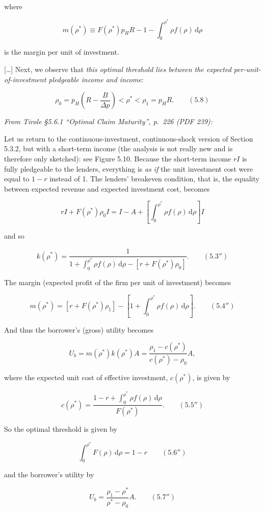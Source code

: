 \documentclass[11pt,a4paper]{article}
\begin{document}
where

\[m(\rho^*) \equiv F(\rho^*)p_HR - 1 - \int_0^{\rho^*}\rho f(\rho)\,\mathrm{d}\rho\]

is the margin per unit of investment.

{[}\ldots{]} Next, we observe that \emph{this optimal threshold lies between the expected
per-unit-of-investment pledgeable income and income}:

\[\rho_0 = p_H\left(R - \frac{B}{\Delta p}\right) < \rho^* < \rho_1 = p_HR. \qquad (5.8)\]

\emph{From Tirole §5.6.1 ``Optimal Claim Maturity'', p.~226 (PDF 239):}

Let us return to the continuous-investment, continuous-shock version of Section 5.3.2, but with a
short-term income (the analysis is not really new and is therefore only sketched): see Figure 5.10.
Because the short-term income \(rI\) is fully pledgeable to the lenders, everything is \emph{as if}
the unit investment cost were equal to \(1 - r\) instead of 1. The lenders' breakeven condition,
that is, the equality between expected revenue and expected investment cost, becomes

\[rI + F(\rho^*)\rho_0I = I - A + \left[\int_0^{\rho^*}\rho f(\rho)\,\mathrm{d}\rho\right]I\]

and so

\[k(\rho^*) = \frac{1}{1 + \int_0^{\rho^*}\rho f(\rho)\,\mathrm{d}\rho - [r + F(\rho^*)\rho_0]}. \qquad (5.3'')\]

The margin (expected profit of the firm per unit of investment) becomes

\[m(\rho^*) = [r + F(\rho^*)\rho_1] - \left[1 + \int_0^{\rho^*}\rho f(\rho)\,\mathrm{d}\rho\right]. \qquad (5.4'')\]

And thus the borrower's (gross) utility becomes

\[U_b = m(\rho^*)k(\rho^*)A = \frac{\rho_1 - c(\rho^*)}{c(\rho^*) - \rho_0}A,\]

where the expected unit cost of effective investment, \(c(\rho^*)\), is given by

\[c(\rho^*) = \frac{1 - r + \int_0^{\rho^*}\rho f(\rho)\,\mathrm{d}\rho}{F(\rho^*)}. \qquad (5.5'')\]

So the optimal threshold is given by

\[\int_0^{\rho^*}F(\rho)\,\mathrm{d}\rho = 1 - r \qquad (5.6'')\]

and the borrower's utility by

\[U_b = \frac{\rho_1 - \rho^*}{\rho^* - \rho_0}A. \qquad (5.7'')\]
\end{document}
